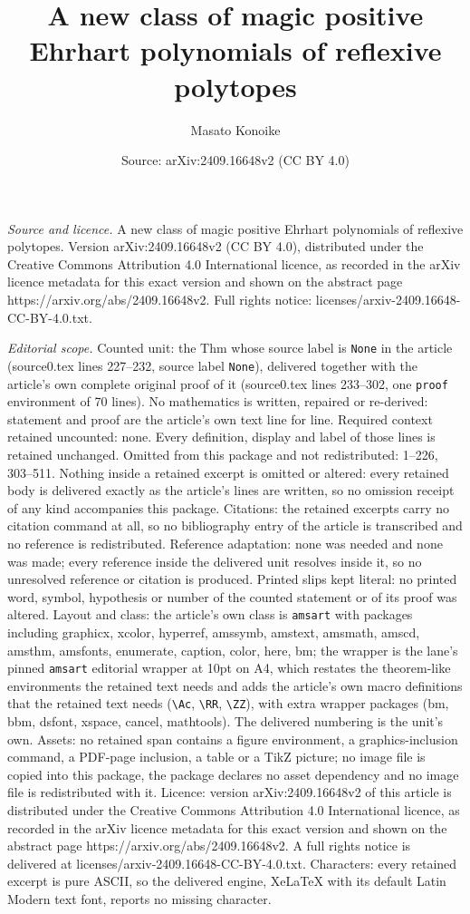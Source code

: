 \documentclass[10pt,a4paper]{amsart}
\title[A new class of magic positive Ehrhart polynomials of reflexi]{A new class of magic positive Ehrhart polynomials of reflexive polytopes}
\author{Masato Konoike}
\date{Source: arXiv:2409.16648v2 (CC BY 4.0)}
\begin{document}
\maketitle

\noindent\emph{Source and licence.} A new class of magic positive Ehrhart polynomials of reflexive polytopes. Version arXiv:2409.16648v2 (CC BY 4.0), distributed under the Creative Commons Attribution 4.0 International licence, as recorded in the arXiv licence metadata for this exact version and shown on the abstract page https://arxiv.org/abs/2409.16648v2. Full rights notice: licenses/arxiv-2409.16648-CC-BY-4.0.txt.\par\smallskip

\noindent\textit{Editorial scope.} Counted unit: the Thm whose source label is \texttt{None} in the article (source0.tex lines 227--232, source label \texttt{None}), delivered together with the article's own complete original proof of it (source0.tex lines 233--302, one \texttt{proof} environment of 70 lines). No mathematics is written, repaired or re-derived: statement and proof are the article's own text line for line. Required context retained uncounted: none. Every definition, display and label of those lines is retained unchanged. Omitted from this package and not redistributed: 1--226, 303--511. Nothing inside a retained excerpt is omitted or altered: every retained body is delivered exactly as the article's lines are written, so no omission receipt of any kind accompanies this package. Citations: the retained excerpts carry no citation command at all, so no bibliography entry of the article is transcribed and no reference is redistributed. Reference adaptation: none was needed and none was made; every reference inside the delivered unit resolves inside it, so no unresolved reference or citation is produced. Printed slips kept literal: no printed word, symbol, hypothesis or number of the counted statement or of its proof was altered. Layout and class: the article's own class is \texttt{amsart} with packages including graphicx, xcolor, hyperref, amssymb, amstext, amsmath, amscd, amsthm, amsfonts, enumerate, caption, color, here, bm; the wrapper is the lane's pinned \texttt{amsart} editorial wrapper at 10pt on A4, which restates the theorem-like environments the retained text needs and adds the article's own macro definitions that the retained text needs (\texttt{\textbackslash Ac}, \texttt{\textbackslash RR}, \texttt{\textbackslash ZZ}), with extra wrapper packages (bm, bbm, dsfont, xspace, cancel, mathtools). The delivered numbering is the unit's own. Assets: no retained span contains a figure environment, a graphics-inclusion command, a PDF-page inclusion, a table or a TikZ picture; no image file is copied into this package, the package declares no asset dependency and no image file is redistributed with it. Licence: version arXiv:2409.16648v2 of this article is distributed under the Creative Commons Attribution 4.0 International licence, as recorded in the arXiv licence metadata for this exact version and shown on the abstract page https://arxiv.org/abs/2409.16648v2. A full rights notice is delivered at licenses/arxiv-2409.16648-CC-BY-4.0.txt. Characters: every retained excerpt is pure ASCII, so the delivered engine, XeLaTeX with its default Latin Modern text font, reports no missing character.
\end{document}
